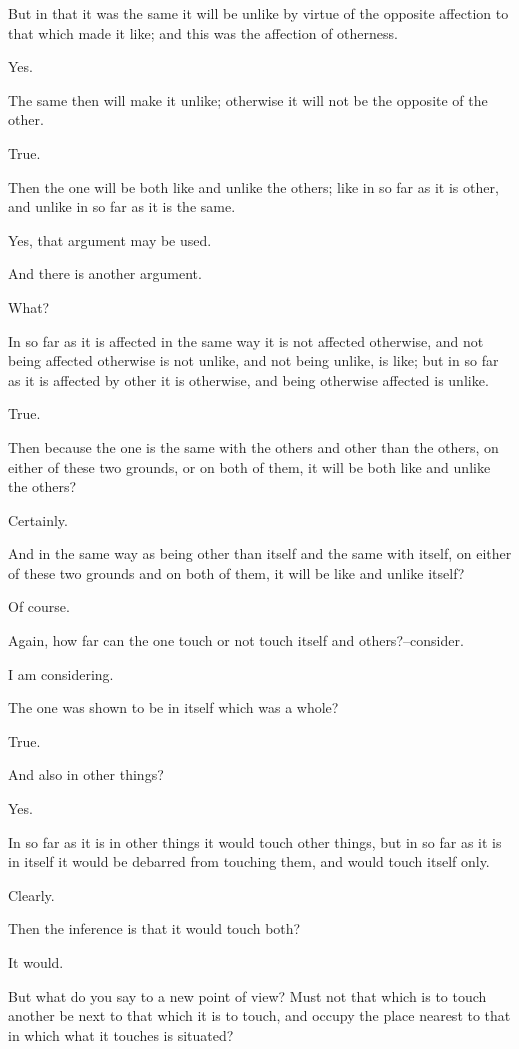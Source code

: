 But in that it was the same it will be unlike by virtue of the opposite
affection to that which made it like; and this was the affection of
otherness.

Yes.

The same then will make it unlike; otherwise it will not be the opposite
of the other.

True.

Then the one will be both like and unlike the others; like in so far as
it is other, and unlike in so far as it is the same.

Yes, that argument may be used.

And there is another argument.

What?

In so far as it is affected in the same way it is not affected
otherwise, and not being affected otherwise is not unlike, and not
being unlike, is like; but in so far as it is affected by other it is
otherwise, and being otherwise affected is unlike.

True.

Then because the one is the same with the others and other than the
others, on either of these two grounds, or on both of them, it will be
both like and unlike the others?

Certainly.

And in the same way as being other than itself and the same with itself,
on either of these two grounds and on both of them, it will be like and
unlike itself?

Of course.

Again, how far can the one touch or not touch itself and
others?--consider.

I am considering.

The one was shown to be in itself which was a whole?

True.

And also in other things?

Yes.

In so far as it is in other things it would touch other things, but in
so far as it is in itself it would be debarred from touching them, and
would touch itself only.

Clearly.

Then the inference is that it would touch both?

It would.

But what do you say to a new point of view? Must not that which is to
touch another be next to that which it is to touch, and occupy the place
nearest to that in which what it touches is situated?

